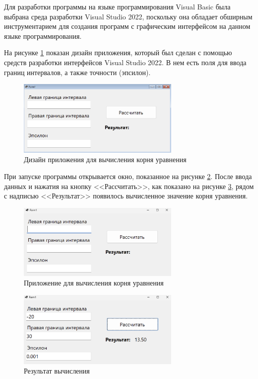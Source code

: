 \documentclass[a4paper, 14pt]{extarticle}
\begin{document}
Для разработки программы на языке программирования Visual Basic была выбрана
среда разработки Visual Studio 2022, поскольку она обладает обширным
инструментарием для создания программ с графическим интерфейсом на данном языке
программирования.

На рисунке \ref{fig:vba/design} показан дизайн приложения, который был
сделан с помощью средств разработки интерфейсов Visual Studio 2022. В нем есть
поля для ввода границ интервалов, а также точности (эпсилон).

\begin{figure}[H]
  \centering
  \includegraphics[width=0.7\textwidth]{images/vba/design.png}
  \caption{Дизайн приложения для вычисления корня уравнения}
  \label{fig:vba/design}
\end{figure}

При запуске программы открывается окно, показанное на рисунке
\ref{fig:vba/empty-form}. После ввода данных и нажатия на кнопку <<Рассчитать>>,
как показано на рисунке \ref{fig:vba/filled-form}, рядом с надписью
<<Результат>> появилось вычисленное значение корня уравнения.

\begin{figure}[H]
  \centering
  \includegraphics[width=0.7\textwidth]{images/vba/empty-form.png}
  \caption{Приложение для вычисления корня уравнения}
  \label{fig:vba/empty-form}
\end{figure}

\begin{figure}[H]
  \centering
  \includegraphics[width=0.7\textwidth]{images/vba/filled-form.png}
  \caption{Результат вычисления}
  \label{fig:vba/filled-form}
\end{figure}
\end{document}
